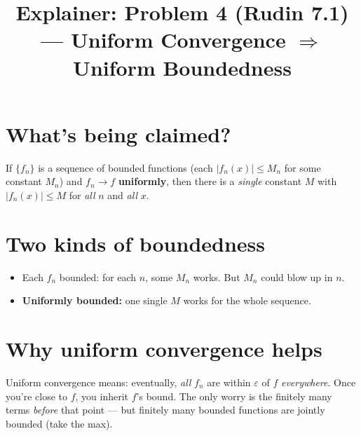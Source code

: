 \documentclass[12pt]{article}
\title{Explainer: Problem 4 (Rudin 7.1) --- Uniform Convergence $\Rightarrow$ Uniform Boundedness}
\author{}
\date{}
\begin{document}
\maketitle

\section*{What's being claimed?}
If $\{f_n\}$ is a sequence of bounded functions (each $|f_n(x)| \leq M_n$ for some constant $M_n$) and $f_n \to f$ \textbf{uniformly}, then there is a \emph{single} constant $M$ with $|f_n(x)| \leq M$ for \emph{all} $n$ and \emph{all} $x$.

\section*{Two kinds of boundedness}
\begin{itemize}
  \item Each $f_n$ bounded: for each $n$, some $M_n$ works. But $M_n$ could blow up in $n$.
  \item \textbf{Uniformly bounded:} one single $M$ works for the whole sequence.
\end{itemize}

\section*{Why uniform convergence helps}
Uniform convergence means: eventually, \emph{all} $f_n$ are within $\varepsilon$ of $f$ \emph{everywhere}. Once you're close to $f$, you inherit $f$'s bound. The only worry is the finitely many terms \emph{before} that point --- but finitely many bounded functions are jointly bounded (take the max).

\begin{center}
\end{center}
\end{document}
